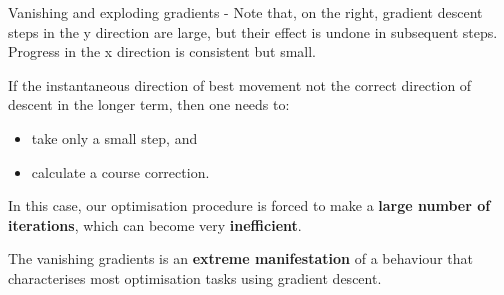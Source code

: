 \begin{frame}[t,allowframebreaks]{
    Vanishing and exploding gradients -}
    {\scriptsize
    Note that, on the right, \gls{gradient descent}
    steps in the y direction are large, but their effect is undone in subsequent steps.
    Progress in the x direction is consistent but small.\\
    }

    \framebreak


    If the instantaneous direction of best movement 
    not the correct direction of 
    descent in the longer term, then one needs to:
    \begin{itemize}
        \item take only a small step, and
        \item calculate a course correction.
    \end{itemize}    

    \vspace{0.1cm}

    In this case, our \gls{optimisation} procedure 
    is forced to make a {\bf large number of iterations},
    which can become very {\bf inefficient}.\\

    \vspace{0.2cm}

    The \glspl{vanishing gradient} 
    is an {\bf extreme manifestation}
    of a behaviour that characterises most
    \gls{optimisation} tasks using
    \gls{gradient descent}.\\

\end{frame}
